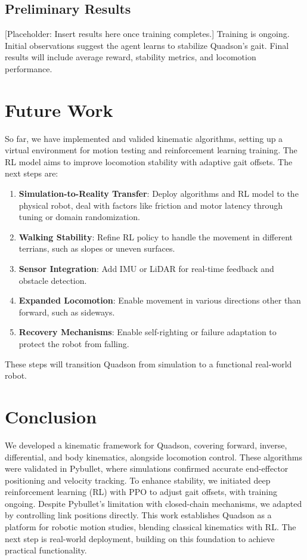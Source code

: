 \documentclass[a4paper,11pt]{article}
\begin{document}
\subsection*{Preliminary Results}

[Placeholder: Insert results here once training completes.]  
Training is ongoing. Initial observations suggest the agent learns to stabilize Quadson's gait. Final results will include average reward, stability metrics, and locomotion performance.

\section*{Future Work}

So far, we have implemented and valided kinematic algorithms, 
setting up a virtual environment for motion testing and reinforcement 
learning training. The RL model aims to improve locomotion stability with 
adaptive gait offsets. The next steps are:

\begin{enumerate}
	\item \textbf{Simulation-to-Reality Transfer}: Deploy algorithms and RL model to the physical robot, deal with factors like friction and motor latency through tuning or domain randomization.
	\item \textbf{Walking Stability}: Refine RL policy to handle the movement in different terrians, such as slopes or uneven surfaces.
	\item \textbf{Sensor Integration}: Add IMU or LiDAR for real-time feedback and obstacle detection.
	\item \textbf{Expanded Locomotion}: Enable movement in various directions other than forward, such as sideways.
	\item \textbf{Recovery Mechanisms}: Enable self-righting or failure adaptation to protect the robot from falling.
\end{enumerate}

These steps will transition Quadson from simulation to a functional real-world robot.

\section*{Conclusion}

We developed a kinematic framework for Quadson, covering forward, inverse, differential, and body kinematics, alongside locomotion control. These algorithms were validated in Pybullet, where simulations confirmed accurate end-effector positioning and velocity tracking. 
To enhance stability, we initiated deep reinforcement learning (RL) with PPO to adjust gait offsets, with training ongoing. Despite Pybullet's limitation with closed-chain mechanisms, we adapted by controlling link positions directly. This work establishes Quadson as a platform for robotic motion studies, 
blending classical kinematics with RL. The next step is real-world deployment, building on this foundation to achieve practical functionality.
\end{document}
